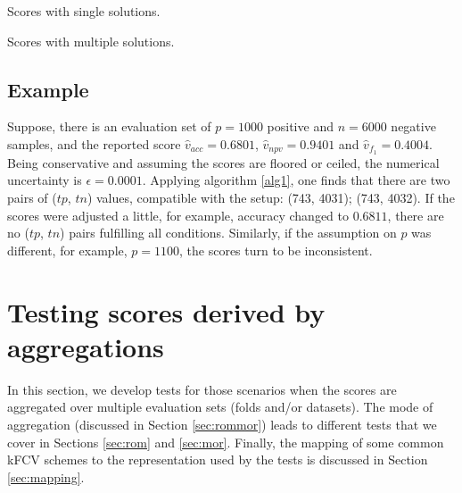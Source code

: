 \documentclass[5p, final]{elsarticle}
\begin{document}
\begin{table}[t!]
\caption{Scores with single solutions.}
\label{tab2}
\begin{scriptsize}
\begin{center}

\end{center}
\end{scriptsize}
\end{table}

\begin{table}[t!]
\caption{Scores with multiple solutions.}
\label{tab3}
\begin{scriptsize}
\begin{center}

\end{center}
\end{scriptsize}
\end{table}

\subsection{Example}
\label{sec:index}

Suppose, there is an evaluation set of $p=1000$ positive and $n=6000$ negative samples, and the reported score $\hat{v}_{acc} = 0.6801$, $\hat{v}_{npv} = 0.9401$ and $\hat{v}_{f_1} = 0.4004$. Being conservative and assuming the scores are floored or ceiled, the numerical uncertainty is $\epsilon = 0.0001$. Applying algorithm \ref{alg1}, one finds that there are two pairs of ($tp$, $tn$) values, compatible with the setup: (743, 4031); (743, 4032). If the scores were adjusted a little, for example, accuracy changed to $0.6811$, there are no ($tp$, $tn$) pairs fulfilling all conditions. Similarly, if the assumption on $p$ was different, for example, $p=1100$, the scores turn to be inconsistent.

\section{Testing scores derived by aggregations}
\label{sec:agg}

In this section, we develop tests for those scenarios when the scores are aggregated over multiple evaluation sets (folds and/or datasets). 
The mode of aggregation (discussed in Section \ref{sec:rommor}) leads to different tests that we cover in Sections \ref{sec:rom} and \ref{sec:mor}. 
Finally, the mapping of some common kFCV schemes to the representation used by the tests is discussed in Section \ref{sec:mapping}. 
\end{document}
